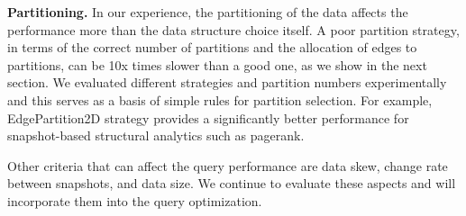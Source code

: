 
{\bf Partitioning.} In our experience, the partitioning of the data
affects the performance more than the data structure choice itself.  A
poor partition strategy, in terms of the correct number of partitions
and the allocation of edges to partitions, can be 10x times slower
than a good one, as we show in the next section.  We evaluated
different strategies and partition numbers experimentally and this
serves as a basis of simple rules for partition selection.  For
example, EdgePartition2D strategy provides a significantly better
performance for snapshot-based structural analytics such as pagerank.

Other criteria that can affect the query performance are data skew,
change rate between snapshots, and data size.  We continue to evaluate
these aspects and will incorporate them into the query optimization.
